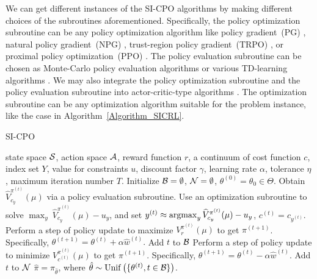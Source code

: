 We can get different instances of the SI-CPO algorithms by making different choices of the subroutines aforementioned.
Specifically, the policy optimization subroutine can be any policy optimization algorithm like policy gradient~(PG) \citep{sutton1999policy}, natural policy gradient~(NPG) \citep{kakade2001natural}, trust-region policy gradient~(TRPO) \cite{schulman2015trust}, or proximal policy optimization~(PPO) \citep{schulman2017proximal}.
The policy evaluation subroutine can be chosen as Monte-Carlo policy evaluation algorithms \citep{curtiss1954theoretical} or various TD-learning algorithms \citep{sutton1988learning, dann2014policy}.
We may also integrate the policy optimization subroutine and the policy evaluation subroutine into actor-critic-type algorithms \citep{konda1999actor}.
The optimization subroutine can be any optimization algorithm suitable for the problem instance, like the case in Algorithm~\ref{Algorithm_SICRL}.

\begin{algorithm}[htb]
   \caption{SI-CPO}
   \label{Algorithm_SICPO}
\begin{algorithmic}
    state space ${\mathcal{S}}$, action space ${\mathcal{A}}$, reward function $r$, a continuum of cost function $c$, index set $Y$, value for constraints $u$, discount factor $\gamma$, learning rate $\alpha$, tolerance $\eta$, maximum iteration number $T$.
   \STATE Initialize ${\mathcal{B}}=\emptyset$, ${\mathcal{N}}=\emptyset$, $\theta^{(0)}=\theta_0\in\Theta$.
   \STATE Obtain $\widehat V_{c_y}^{\pi^{(t)}}(\mu)$ via a policy evaluation subroutine.
   \STATE Use an optimization subroutine to solve ${\max_y\ \widehat V_{c_y}^{\pi^{(t)}}(\mu)-u_y}$, and set ${y^{(t)}\approx\operatorname*{argmax}_y \widehat V_{c_y}^{\pi^{(t)}}(\mu)-u_y}$, $c^{(t)}=c_{y^{(t)}}$.
   \STATE  Perform a step of policy update to maximize $V_r^{\pi^{(t)}}(\mu)$ to get $\pi^{(t+1)}$. Specifically,
   ${\theta^{(t+1)}=\theta^{(t)}+\alpha\hat w^{(t)}}.$
   \STATE Add $t$ to ${\mathcal{B}}$
   \ELSE 
   \STATE  Perform a step of policy update to minimize $V_{c^{(t)}}^{\pi^{(t)}}(\mu)$ to get $\pi^{(t+1)}$. Specifically, ${\theta^{(t+1)}=\theta^{(t)}-\alpha\hat w^{(t)}}.$
   \STATE Add $t$ to ${\mathcal{N}}$
   \ENDIF
   \ENDFOR
    $\hat\pi=\pi_{\hat\theta}$, where $\hat\theta\sim\mathrm{Unif}\left(\{\theta^{(t)}, t\in{\mathcal{B}}\}\right)$.
\end{algorithmic}
\end{algorithm}
